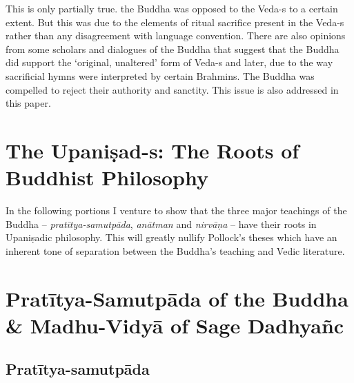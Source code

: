 This is only partially true. the Buddha was opposed to the Veda-s to a certain extent. But this was due to the elements of ritual sacrifice present in the Veda-s rather than any disagreement with language convention. There are also opinions from some scholars and dialogues of the Buddha that suggest that the Buddha did support the ‘original, unaltered’ form of Veda-s and later, due to the way sacrificial hymns were interpreted by certain Brahmins. The Buddha was compelled to reject their authority and sanctity. This issue is also addressed in this paper.


\section*{The Upaniṣad-s: The Roots of Buddhist Philosophy}

In the following portions I venture to show that the three major teachings of the Buddha – \textit{pratītya-samutpāda}, \textit{anātman} and \textit{nirvāṇa} – have their roots in Upaniṣadic philosophy. This will greatly nullify Pollock’s theses which have an inherent tone of separation between the Buddha’s teaching and Vedic literature.

\vspace{-.3cm}

\section*{Pratītya-Samutpāda of the Buddha \& Madhu-Vidyā of Sage Dadhyañc}

\subsection*{Pratītya-samutpāda}

